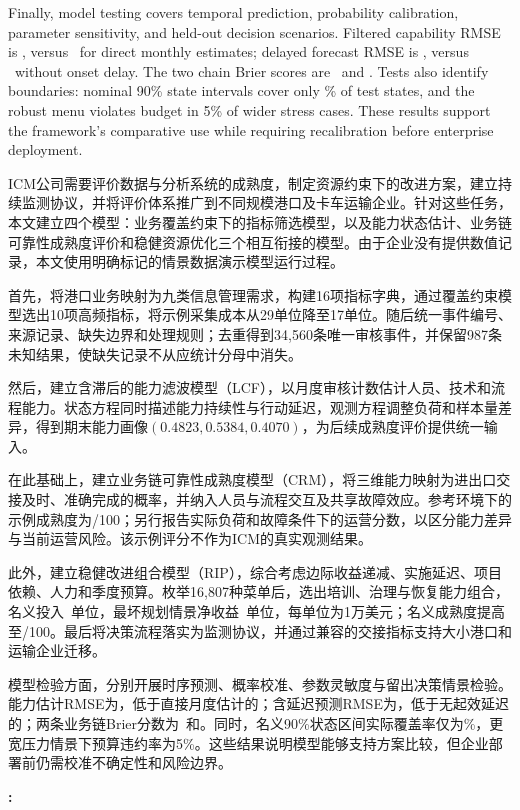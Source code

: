 {Finally, model testing covers temporal prediction, probability calibration, parameter sensitivity, and held-out decision scenarios. Filtered capability RMSE is \StateRMSE, versus \RawRMSE\ for direct monthly estimates; delayed forecast RMSE is \ForecastRMSE, versus \ZeroRMSE\ without onset delay. The two chain Brier scores are \BrierImport\ and \BrierExport. Tests also identify boundaries: nominal 90\% state intervals cover only \Coverage\% of test states, and the robust menu violates budget in 5\% of wider stress cases. These results support the framework's comparative use while requiring recalibration before enterprise deployment.
}{
ICM公司需要评价数据与分析系统的成熟度，制定资源约束下的改进方案，建立持续监测协议，并将评价体系推广到不同规模港口及卡车运输企业。针对这些任务，本文建立四个模型：业务覆盖约束下的指标筛选模型，以及能力状态估计、业务链可靠性成熟度评价和稳健资源优化三个相互衔接的模型。由于企业没有提供数值记录，本文使用明确标记的情景数据演示模型运行过程。

首先，将港口业务映射为九类信息管理需求，构建16项指标字典，通过覆盖约束模型选出10项高频指标，将示例采集成本从29单位降至17单位。随后统一事件编号、来源记录、缺失边界和处理规则；去重得到34,560条唯一审核事件，并保留987条未知结果，使缺失记录不从应统计分母中消失。

然后，建立含滞后的能力滤波模型（LCF），以月度审核计数估计人员、技术和流程能力。状态方程同时描述能力持续性与行动延迟，观测方程调整负荷和样本量差异，得到期末能力画像$(0.4823,0.5384,0.4070)$，为后续成熟度评价提供统一输入。

在此基础上，建立业务链可靠性成熟度模型（CRM），将三维能力映射为进出口交接及时、准确完成的概率，并纳入人员与流程交互及共享故障效应。参考环境下的示例成熟度为\BaseMaturity/100；另行报告实际负荷和故障条件下的运营分数，以区分能力差异与当前运营风险。该示例评分不作为ICM的真实观测结果。

此外，建立稳健改进组合模型（RIP），综合考虑边际收益递减、实施延迟、项目依赖、人力和季度预算。枚举16,807种菜单后，选出培训、治理与恢复能力组合，名义投入\PlanCost\ 单位，最坏规划情景净收益\WorstNet\ 单位，每单位为1万美元；名义成熟度提高至\FinalMaturity/100。最后将决策流程落实为监测协议，并通过兼容的交接指标支持大小港口和运输企业迁移。

模型检验方面，分别开展时序预测、概率校准、参数灵敏度与留出决策情景检验。能力估计RMSE为\StateRMSE，低于直接月度估计的\RawRMSE；含延迟预测RMSE为\ForecastRMSE，低于无起效延迟的\ZeroRMSE；两条业务链Brier分数为\BrierImport\ 和\BrierExport。同时，名义90\%状态区间实际覆盖率仅为\Coverage\%，更宽压力情景下预算违约率为5\%。这些结果说明模型能够支持方案比较，但企业部署前仍需校准不确定性和风险边界。
}
\par\smallskip\noindent\textbf{:} 

